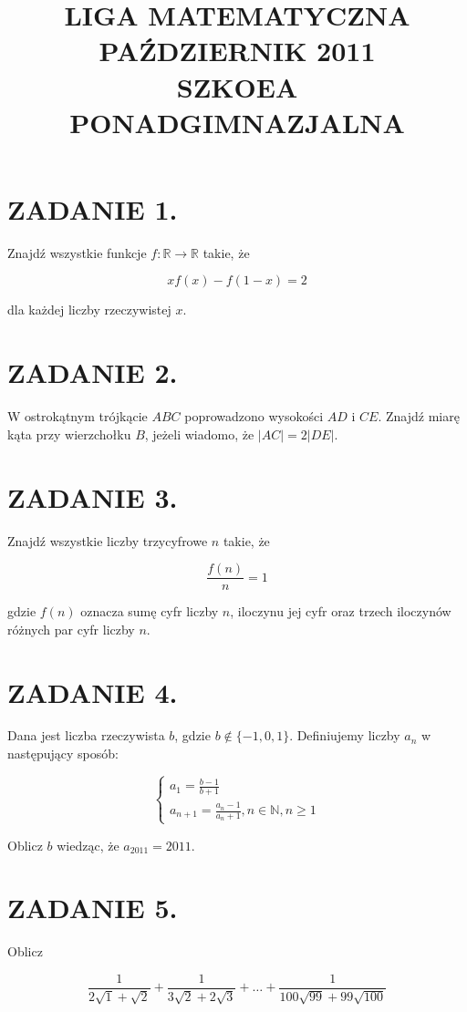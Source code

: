 \documentclass[10pt]{article}
\title{LIGA MATEMATYCZNA \\
 PAŹDZIERNIK 2011 \\
 SZKOEA PONADGIMNAZJALNA }
\author{}
\date{}
\begin{document}
\maketitle
\section*{ZADANIE 1.}
Znajdź wszystkie funkcje \(f: \mathbb{R} \rightarrow \mathbb{R}\) takie, że

\[
x f(x)-f(1-x)=2
\]

dla każdej liczby rzeczywistej \(x\).

\section*{ZADANIE 2.}
W ostrokątnym trójkącie \(A B C\) poprowadzono wysokości \(A D\) i \(C E\). Znajdź miarę kąta przy wierzchołku \(B\), jeżeli wiadomo, że \(|A C|=2|D E|\).

\section*{ZADANIE 3.}
Znajdź wszystkie liczby trzycyfrowe \(n\) takie, że

\[
\frac{f(n)}{n}=1
\]

gdzie \(f(n)\) oznacza sumę cyfr liczby \(n\), iloczynu jej cyfr oraz trzech iloczynów różnych par cyfr liczby \(n\).

\section*{ZADANIE 4.}
Dana jest liczba rzeczywista \(b\), gdzie \(b \notin\{-1,0,1\}\). Definiujemy liczby \(a_{n}\) w następujący sposób:

\[
\left\{\begin{array}{l}
a_{1}=\frac{b-1}{b+1} \\
a_{n+1}=\frac{a_{n}-1}{a_{n}+1}, n \in \mathbb{N}, n \geq 1
\end{array}\right.
\]

Oblicz \(b\) wiedząc, że \(a_{2011}=2011\).

\section*{ZADANIE 5.}
Oblicz

\[
\frac{1}{2 \sqrt{1}+\sqrt{2}}+\frac{1}{3 \sqrt{2}+2 \sqrt{3}}+\ldots+\frac{1}{100 \sqrt{99}+99 \sqrt{100}}
\]
\end{document}
